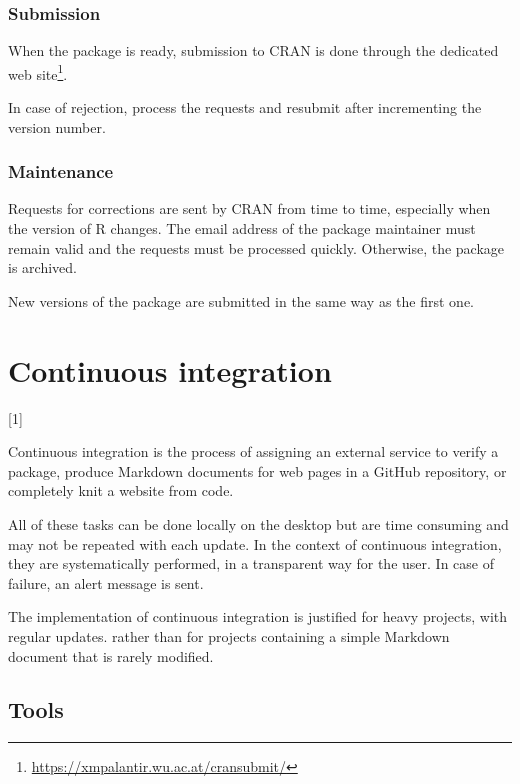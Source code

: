 \documentclass[
  12pt,
  american,
  a4paper,
  extrafontsizes,onecolumn,openright
  ]{memoir}
\newlength{\rf}
\newcommand{\toc}[1]{%
  \startcontents[chapters]%
  \printcontents[chapters]{}{1}[#1]{}%
  ~\newline%
}
\begin{document}
\hypertarget{submission}{%
\subsection{Submission}\label{submission}}

When the package is ready, submission to CRAN is done through the dedicated web site\footnote{\url{https://xmpalantir.wu.ac.at/cransubmit/}}.

In case of rejection, process the requests and resubmit after incrementing the version number.

\hypertarget{maintenance}{%
\subsection{Maintenance}\label{maintenance}}

Requests for corrections are sent by CRAN from time to time, especially when the version of R changes.
The email address of the package maintainer must remain valid and the requests must be processed quickly.
Otherwise, the package is archived.

New versions of the package are submitted in the same way as the first one.

\hypertarget{chap-ci}{%
\chapter{Continuous integration}\label{chap-ci}}

\toc{1}

Continuous integration is the process of assigning an external service to verify a package, produce Markdown documents for web pages in a GitHub repository, or completely knit a website from code.

All of these tasks can be done locally on the desktop but are time consuming and may not be repeated with each update.
In the context of continuous integration, they are systematically performed, in a transparent way for the user.
In case of failure, an alert message is sent.

The implementation of continuous integration is justified for heavy projects, with regular updates.
rather than for projects containing a simple Markdown document that is rarely modified.

\hypertarget{tools}{%
\section{Tools}\label{tools}}
\end{document}
